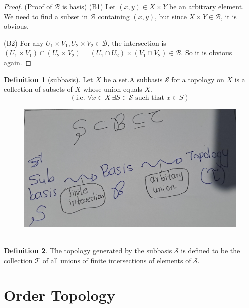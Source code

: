 \documentclass[
]{book}
\theoremstyle{definition}
\newtheorem{definition}{Definition}[chapter]
\theoremstyle{definition}
\theoremstyle{definition}
\theoremstyle{definition}
\theoremstyle{remark}
\begin{document}
\begin{proof}
(Proof of \(\mathcal{B}\) is basis)
(B1) Let \((x, y) \in X \times Y\) be an arbitrary element. We need to find a subset in \(\mathcal{B}\) containing \((x, y)\), but since \(X \times Y \in \mathcal{B}\), it is obvious.

(B2) For any \(U_{1} \times V_{1}, U_{2} \times V_{2} \in \mathcal{B}\), the intersection is \(\left(U_{1} \times V_{1}\right) \cap\left(U_{2} \times V_{2}\right)=\left(U_{1} \cap U_{2}\right) \times\left(V_{1} \cap V_{2}\right) \in \mathcal{B}\). So it is obvious again.
\end{proof}

\begin{definition}[subbasis]
\protect\hypertarget{def:unnamed-chunk-23}{}\label{def:unnamed-chunk-23}Let \(X\) be a set.A subbasis \(\mathcal{S}\) for a topology on \(X\) is a collection of subsets of \(X\) whose union equals \(X\).
\[\left(\text{i.e. }\forall x\in X ~\exists S\in\mathcal{S} \text{  such that } x\in S\right)\]
\end{definition}

\begin{figure}
\centering
\includegraphics{figures/figure 06.jpg}
\caption{\label{fig:64}\(~\)}
\end{figure}

\begin{definition}
\protect\hypertarget{def:unnamed-chunk-24}{}\label{def:unnamed-chunk-24}The topology generated by the subbasis \(\mathcal{S}\) is defined to be the collection \(\mathcal{T}\) of all unions of finite intersections of elements of \(\mathcal{S}\).
\end{definition}

\hypertarget{order-topology}{%
\section{Order Topology}\label{order-topology}}
\end{document}
